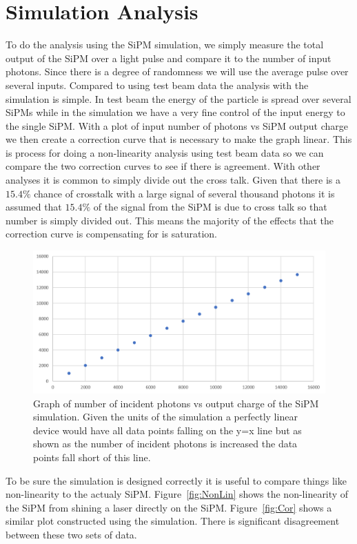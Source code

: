 \section{Simulation Analysis}

To do the analysis using the SiPM simulation, we simply measure the total output of the SiPM over a light pulse and compare it to the number of input photons. Since there is a degree of randomness we will use the average pulse over several inputs. Compared to using test beam data the analysis with the simulation is simple. In test beam the energy of the particle is spread over several SiPMs while in the simulation we have a very fine control of the input energy to the single SiPM. With a plot of input number of photons vs SiPM output charge we then create a correction curve that is necessary to make the graph linear. This is process for doing a non-linearity analysis using test beam data so we can compare the two correction curves to see if there is agreement. With other analyses it is common to simply divide out the cross talk. Given that there is a $15.4\%$ chance of crosstalk with a large signal of several thousand photons it is assumed that $15.4\%$ of the signal from the SiPM is due to cross talk so that number is simply divided out. This means the majority of the effects that the correction curve is compensating for is saturation. 

\begin{figure}
\centering
\includegraphics[width=\linewidth]{Figures/SimNon.png}
\caption{Graph of number of incident photons vs output charge of the SiPM simulation. Given the units of the simulation a perfectly linear device would have all data points falling on the y=x line but as shown as the number of incident photons is increased the data points fall short of this line.}
\label{fig:SimNon}
\end{figure}

To be sure the simulation is designed correctly it is useful to compare things like non-linearity to the actualy SiPM. Figure~\ref{fig:NonLin} shows the non-linearity of the SiPM from shining a laser directly on the SiPM. Figure~\ref{fig:Cor} shows a similar plot constructed using the simulation. There is significant disagreement between these two sets of data.

